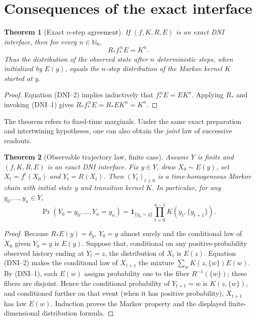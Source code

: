 \documentclass[11pt,letterpaper]{article}
\newtheorem{theorem}{Theorem}[section]
\theoremstyle{definition}
\theoremstyle{remark}
\newcommand{\one}{\mathbf 1}
\newcommand{\NN}{\mathbb N}
\begin{document}
\section{Consequences of the exact interface}
\begin{theorem}[Exact $n$-step agreement]\label{thm:iterates}
If $(f,K,R,E)$ is an exact DNI interface, then for every $n\in\NN_0$,
\begin{equation}\label{eq:nstep}
\boxed{R_*f_*^{\,n}E=K^n.}
\end{equation}
Thus the distribution of the observed state after $n$ deterministic steps, when initialized by $E(y)$, equals the $n$-step distribution of the Markov kernel $K$ started at $y$.
\end{theorem}
\begin{proof}
Equation (DNI--2) implies inductively that $f_*^{\,n}E=EK^n$. Applying $R_*$ and invoking (DNI--1) gives $R_*f_*^{\,n}E=R_*EK^n=K^n$.
\end{proof}

The theorem refers to fixed-time marginals. Under the same exact preparation and intertwining hypotheses, one can also obtain the \emph{joint} law of successive readouts.

\begin{theorem}[Observable trajectory law, finite case]\label{thm:paths}
Assume $Y$ is finite and $(f,K,R,E)$ is an exact DNI interface. Fix $y\in Y$, draw $X_0\sim E(y)$, set $X_t=f^t(X_0)$ and $Y_t=R(X_t)$. Then $(Y_t)_{t\ge 0}$ is a time-homogeneous Markov chain with initial state $y$ and transition kernel $K$. In particular, for any $y_0,\ldots,y_n\in Y$,
\begin{equation}\label{eq:pathlaw}
\Pr(Y_0=y_0,\ldots,Y_n=y_n)
=\one_{\{y_0=y\}}\prod_{t=0}^{n-1}K(y_t,\{y_{t+1}\}).
\end{equation}
\end{theorem}
\begin{proof}
Because $R_*E(y)=\delta_y$, $Y_0=y$ almost surely and the conditional law of $X_0$ given $Y_0=y$ is $E(y)$. Suppose that, conditional on any positive-probability observed history ending at $Y_t=z$, the distribution of $X_t$ is $E(z)$. Equation (DNI--2) makes the conditional law of $X_{t+1}$ the mixture $\sum_w K(z,\{w\})E(w)$. By (DNI--1), each $E(w)$ assigns probability one to the fiber $R^{-1}(\{w\})$; these fibers are disjoint. Hence the conditional probability of $Y_{t+1}=w$ is $K(z,\{w\})$, and conditioned further on that event (when it has positive probability), $X_{t+1}$ has law $E(w)$. Induction proves the Markov property and the displayed finite-dimensional distribution formula.
\end{proof}
\end{document}
